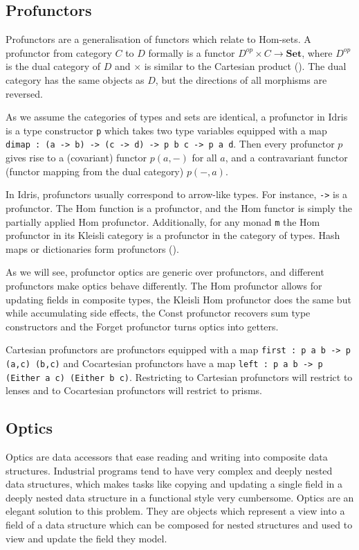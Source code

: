 \documentclass[]{report}
\begin{document}
\subsection{Profunctors}

Profunctors are a generalisation of functors which relate to Hom-sets. A profunctor from category $C$ to $D$ formally is a functor $D^{op}\times C\to\mathbf{Set}$, where $D^{op}$ is the dual category of $D$ and $\times$ is similar to the Cartesian product (\cite{nlab:profunctor}). The dual category has the same objects as $D$, but the directions of all morphisms are reversed.

As we assume the categories of types and sets are identical, a profunctor in Idris is a type constructor \texttt{p} which takes two type variables equipped with a map \texttt{dimap : (a -> b) -> (c -> d) -> p b c -> p a d}. Then every profunctor $p$ gives rise to a (covariant) functor $p(a,-)$ for all $a$, and a contravariant functor (functor mapping from the dual category) $p(-,a)$.

In Idris, profunctors usually correspond to arrow-like types. For instance, \texttt{->} is a profunctor. The Hom function is a profunctor, and the Hom functor is simply the partially applied Hom profunctor. Additionally, for any monad \texttt{m} the Hom profunctor in its Kleisli category is a profunctor in the category of types. Hash maps or dictionaries form profunctors (\cite{milewskicoends}).

As we will see, profunctor optics are generic over profunctors, and different profunctors make optics behave differently. The Hom profunctor allows for updating fields in composite types, the Kleisli Hom profunctor does the same but while accumulating side effects, the Const profunctor recovers sum type constructors and the Forget profunctor turns optics into getters.

Cartesian profunctors are profunctors equipped with a map \texttt{first : p a b -> p (a,c) (b,c)} and Cocartesian profunctors have a map \texttt{left : p a b -> p (Either a c) (Either b c)}. Restricting to Cartesian profunctors will restrict to lenses and to Cocartesian profunctors will restrict to prisms.

\subsection{Optics}

Optics are data accessors that ease reading and writing into composite data structures. Industrial programs tend to have very complex and deeply nested data structures, which makes tasks like copying and updating a single field in a deeply nested data structure in a functional style very cumbersome. Optics are an elegant solution to this problem. They are objects which represent a view into a field of a data structure which can be composed for nested structures and used to view and update the field they model.
\end{document}

